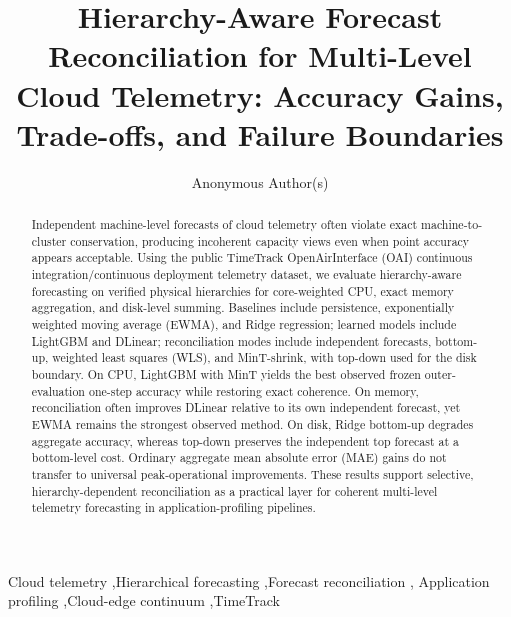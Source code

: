 \documentclass[a4paper,fleqn]{cas-dc}
\begin{document}
\let\WriteBookmarks\relax


\title[mode=title]{Hierarchy-Aware Forecast Reconciliation for Multi-Level Cloud Telemetry: Accuracy Gains, Trade-offs, and Failure Boundaries}

\author[1]{Anonymous Author(s)}

\begin{abstract}
Independent machine-level forecasts of cloud telemetry often violate exact
machine-to-cluster conservation, producing incoherent capacity views even when
point accuracy appears acceptable. Using the public TimeTrack OpenAirInterface
({OAI}) continuous integration/continuous deployment telemetry dataset, we
evaluate hierarchy-aware forecasting on verified physical hierarchies for
core-weighted {CPU}, exact memory aggregation, and disk-level summing.
Baselines include persistence, exponentially weighted moving average ({EWMA}),
and Ridge regression; learned models include LightGBM and DLinear; reconciliation
modes include independent forecasts, bottom-up, weighted least squares ({WLS}),
and MinT-shrink, with top-down used for the disk boundary.
On {CPU}, LightGBM with MinT yields the best observed frozen outer-evaluation
one-step accuracy while restoring exact coherence.
On memory, reconciliation often improves DLinear relative to its own independent
forecast, yet {EWMA} remains the strongest observed method.
On disk, Ridge bottom-up degrades aggregate accuracy, whereas top-down preserves
the independent top forecast at a bottom-level cost.
Ordinary aggregate mean absolute error ({MAE}) gains do not transfer to universal
peak-operational improvements.
These results support selective, hierarchy-dependent reconciliation as a practical
layer for coherent multi-level telemetry forecasting in application-profiling
pipelines.
\end{abstract}

\begin{keywords}
Cloud telemetry \sep Hierarchical forecasting \sep Forecast reconciliation \sep
Application profiling \sep Cloud-edge continuum \sep TimeTrack
\end{keywords}

\maketitle
\end{document}
